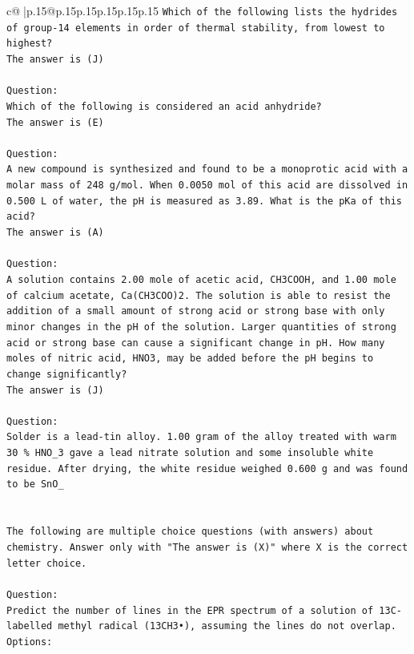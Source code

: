 \documentclass{article}
\begin{document}
{\begin{supertabular}{c@{$\;$}|p{.15\linewidth}@{}p{.15\linewidth}p{.15\linewidth}p{.15\linewidth}p{.15\linewidth}p{.15\linewidth}}
{{{\texttt{Which of the following lists the hydrides of group{-}14 elements in order of thermal stability, from lowest to highest?} \\
\texttt{The answer is (J)} \\
\\ 
\texttt{Question:} \\
\texttt{Which of the following is considered an acid anhydride?} \\
\texttt{The answer is (E)} \\
\\ 
\texttt{Question:} \\
\texttt{A new compound is synthesized and found to be a monoprotic acid with a molar mass of 248 g/mol. When 0.0050 mol of this acid are dissolved in 0.500 L of water, the pH is measured as 3.89. What is the pKa of this acid?} \\
\texttt{The answer is (A)} \\
\\ 
\texttt{Question:} \\
\texttt{A solution contains 2.00 mole of acetic acid, CH3COOH, and 1.00 mole of calcium acetate, Ca(CH3COO)2. The solution is able to resist the addition of a small amount of strong acid or strong base with only minor changes in the pH of the solution. Larger quantities of strong acid or strong base can cause a significant change in pH. How many moles of nitric acid, HNO3, may be added before the pH begins to change significantly?} \\
\texttt{The answer is (J)} \\
\\ 
\texttt{Question:} \\
\texttt{Solder is a lead{-}tin alloy. 1.00 gram of the alloy treated with warm 30 \% HNO\_3 gave a lead nitrate solution and some insoluble white residue. After drying, the white residue weighed 0.600 g and was found to be SnO\_} \\
\\ 
\\ 
\texttt{The following are multiple choice questions (with answers) about chemistry. Answer only with "The answer is (X)" where X is the correct letter choice.} \\
\\ 
\texttt{Question:} \\
\texttt{Predict the number of lines in the EPR spectrum of a solution of 13C{-}labelled methyl radical (13CH3•), assuming the lines do not overlap.} \\
\texttt{Options:} \\
}}}
\end{supertabular}}
\end{document}
